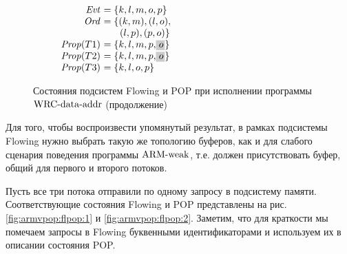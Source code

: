 \begin{figure}
  \begin{subfigure}{.5\textwidth}
\begin{center}
\end{center}
    \caption{}
    \label{fig:armvpop:flpop:11} 
  \end{subfigure}%
  \begin{subfigure}{.5\textwidth}
\begin{center}
\parbox{63mm}{$\begin{array}{@{}r@{~}l@{}}
  \Evt      &= \{k, l, m, o, p\} \\
  \Ord      &= \{ (k, m), (l, o), \\
            & ~~\quad (l, p), (p, o) \} \\
  \Prop(T1) &= \{k, l, m, p, \graybox{o}\} \\
  \Prop(T2) &= \{k, l, m, p, \graybox{o}\} \\
  \Prop(T3) &= \{k, l, o, p\} \\
\end{array}$}
\end{center}
    \caption{}
    \label{fig:armvpop:flpop:12}
  \end{subfigure}

  \caption{Состояния подсистем Flowing и POP при исполнении программы ${\rm WRC\text{-}data\text{-}addr}$ (продолжение)}
  \label{fig:armvpop:flpop}
\end{figure}

Для того, чтобы воспроизвести упомянутый результат, в рамках подсистемы Flowing нужно
выбрать такую же топологию буферов, как и для слабого сценария поведения программы
${\rm ARM\text{-}weak}$, т.е. должен присутствовать буфер, общий для первого и второго потоков.

Пусть все три потока отправили по одному запросу в подсистему памяти.
Соответствующие состояния Flowing и POP представлены на
рис. \ref{fig:armvpop:flpop:1} и \ref{fig:armvpop:flpop:2}.
Заметим, что для краткости мы помечаем запросы в Flowing буквенными
идентификаторами и используем их в описании состояния POP.

